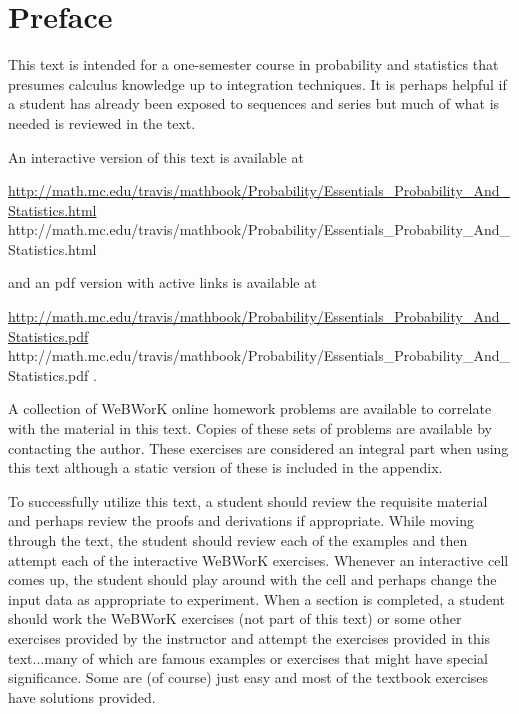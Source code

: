 \documentclass[10pt,]{book}
\numberwithin{equation}{section}
\begin{document}
\chapter*{Preface}\label{preface-1}
\hypertarget{p-4}{}%
This text is intended for a one-semester course in probability and statistics that presumes calculus knowledge up to integration techniques. It is perhaps helpful if a student has already been exposed to sequences and series but much of what is needed is reviewed in the text.%
\par
\hypertarget{p-5}{}%
An interactive version of this text is available at%
\par
\hypertarget{p-6}{}%
\href{http://math.mc.edu/travis/mathbook/Probability/Essentials_Probability_And_Statistics.html}{http://math.mc.edu/travis/mathbook/Probability/Essentials_Probability_And_Statistics.html} http://math.mc.edu/travis/mathbook/Probability/Essentials_Probability_And_Statistics.html%
\par
\hypertarget{p-7}{}%
and an pdf version with active links is available at%
\par
\hypertarget{p-8}{}%
\href{http://math.mc.edu/travis/mathbook/Probability/Essentials_Probability_And_Statistics.pdf}{http://math.mc.edu/travis/mathbook/Probability/Essentials_Probability_And_Statistics.pdf} http://math.mc.edu/travis/mathbook/Probability/Essentials_Probability_And_Statistics.pdf .%
\par
\hypertarget{p-9}{}%
A collection of WeBWorK online homework problems are available to correlate with the material in this text. Copies of these sets of problems are available by contacting the author. These exercises are considered an integral part when using this text although a static version of these is included in the appendix.%
\par
\hypertarget{p-10}{}%
To successfully utilize this text, a student should review the requisite material and perhaps review the proofs and derivations if appropriate. While moving through the text, the student should review each of the examples and then attempt each of the interactive WeBWorK exercises. Whenever an interactive cell comes up, the student should play around with the cell and perhaps change the input data as appropriate to experiment. When a section is completed, a student should work the WeBWorK exercises (not part of this text) or some other exercises provided by the instructor and attempt the exercises provided in this text...many of which are famous examples or exercises that might have special significance.  Some are (of course) just easy and most of the textbook exercises have solutions provided.%
\end{document}
